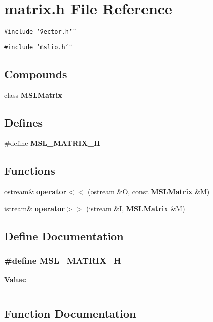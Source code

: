 \section{matrix.h File Reference}
\label{matrix_8h}
{\tt \#include \char`\"{}vector.h\char`\"{}}\par
{\tt \#include \char`\"{}mslio.h\char`\"{}}\par
\subsection*{Compounds}
\begin{CompactItemize}
\item 
class {\bf MSLMatrix}
\end{CompactItemize}
\subsection*{Defines}
\begin{CompactItemize}
\item 
\#define {\bf MSL\_\-MATRIX\_\-H}
\end{CompactItemize}
\subsection*{Functions}
\begin{CompactItemize}
\item 
ostream\& {\bf operator$<$$<$} (ostream \&O, const {\bf MSLMatrix} \&M)
\item 
istream\& {\bf operator$>$$>$} (istream \&I, {\bf MSLMatrix} \&M)
\end{CompactItemize}


\subsection{Define Documentation}
\subsubsection{\setlength{\rightskip}{0pt plus 5cm}\#define MSL\_\-MATRIX\_\-H}\label{matrix_8h_a0}


{\bf Value:}\footnotesize\begin{verbatim}
\end{verbatim}\normalsize 


\subsection{Function Documentation}

